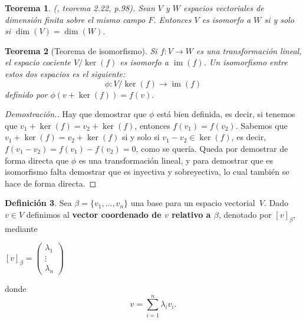 \documentclass[12pt]{book}
\newtheorem{theorem}{Teorema}[section]
\theoremstyle{definition}
\newtheorem{definition}[theorem]{Definición}
\DeclareMathOperator{\im}{im}
\newcounter{in}
\newcounter{ini}
\begin{document}
\begin{theorem}{\normalfont (\cite{friedberg1982algebra}, teorema 2.22, p.98)}.
  \label{esp-isomorfos}
  Sean $V$ y $W$ espacios vectoriales de dimensión finita sobre el
  mismo campo $F$. Entonces $V$ es isomorfo a $W$
  si y solo si $\dim (V)=\dim(W).$
\end{theorem}

\begin{theorem}[Teorema de isomorfismo]
  \label{teorema-isomorfismo-esp}
  Si $f:V\rightarrow W$ es una transformación lineal, el espacio
  cociente $V/\ker(f)$ es isomorfo a $\im(f)$. Un isomorfismo entre estos dos
  espacios es el siguiente:
  $$\phi:V/\ker(f)\rightarrow \im(f)$$
  definido por $\phi(v+\ker(f))=f(v).$
\end{theorem}
\begin{proof}[Demostración.]
  Hay que demostrar que $\phi$ está bien definida, es decir, si
  tenemos que
  $v_1+\ker(f)=v_2+\ker(f)$, entonces
  $f(v_1)=f(v_{2}).$ Sabemos que 
  $v_1+\ker(f)=v_2+\ker(f)$ si y solo si
  $v_{1}-v_{2}\in \ker(f)$, es decir,~$f(v_{1}-v_{2})=f(v_1)-f(v_2)=0$,
  como se quería. Queda por demostrar de forma directa que $\phi$ es
  una transformación lineal, y para demostrar que es isomorfismo falta
  demostrar que es inyectiva y sobreyectiva, lo cual también se hace
  de forma directa.
\end{proof}

\begin{definition}
  \label{vec-coor}
  Sea $\beta=\{v_{1},\ldots,v_{n}\}$ una base para un espacio
  vectorial~$V$. Dado $v\in V$ definimos al \textbf{vector coordenado de $v$
  relativo a $\beta$}, denotado por $[v]_{\beta}$, mediante
  \begin{center}
    $[v]_{\beta}=\begin{pmatrix}
      \lambda_{1}  \\
      \vdots  \\
      \lambda_{n}  
    \end{pmatrix}$
  \end{center}
donde
\begin{equation*}
  v=\sum^{n}_{i=1}\lambda_{i}v_{i}.
\end{equation*}
\end{definition}
\end{document}
